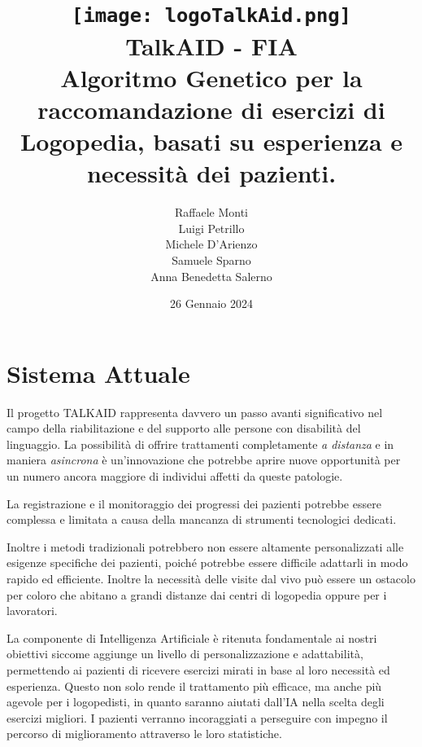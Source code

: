 \documentclass{article}
\begin{document}
\pagestyle{fancy}
\fancyhead{}

    \title{
    \texttt{[image: logoTalkAid.png]} \\[1cm]
    \textbf{TalkAID - FIA}\\
    \vspace{0.5cm}
    \large Algoritmo Genetico per la raccomandazione di esercizi di Logopedia, basati su esperienza e necessità dei pazienti.
}
    \author{
    Raffaele Monti\\
    Luigi Petrillo\\
    Michele D'Arienzo\\
     Samuele Sparno\\
    Anna Benedetta Salerno
}
    \date{26 Gennaio 2024}

    \maketitle

    \pagebreak

    \tableofcontents

    \pagebreak

    \section{Sistema Attuale}

    Il progetto TALKAID rappresenta davvero un passo avanti significativo nel campo della riabilitazione e del supporto alle persone con disabilità del linguaggio. La possibilità di offrire trattamenti completamente \textit{a distanza} e in maniera \textit{asincrona} è un'innovazione che potrebbe aprire nuove opportunità per un numero ancora maggiore di individui affetti da queste patologie.

    La registrazione e il monitoraggio dei progressi dei pazienti potrebbe essere complessa e limitata a causa della mancanza di strumenti tecnologici dedicati.

    Inoltre i metodi tradizionali potrebbero non essere altamente personalizzati alle esigenze specifiche dei pazienti, poiché potrebbe essere difficile adattarli in modo rapido ed efficiente. Inoltre la necessità delle visite dal vivo può essere un ostacolo per coloro che abitano a grandi distanze dai centri di logopedia oppure per i lavoratori.



    La componente di Intelligenza Artificiale è ritenuta fondamentale ai nostri obiettivi siccome aggiunge un livello di personalizzazione e adattabilità, permettendo ai pazienti di ricevere esercizi mirati in base al loro necessità ed esperienza. Questo non solo rende il trattamento più efficace, ma anche più agevole per i logopedisti, in quanto saranno aiutati dall'IA nella scelta degli esercizi migliori. I pazienti verranno incoraggiati a perseguire con impegno il percorso di miglioramento attraverso le loro statistiche.
\end{document}
